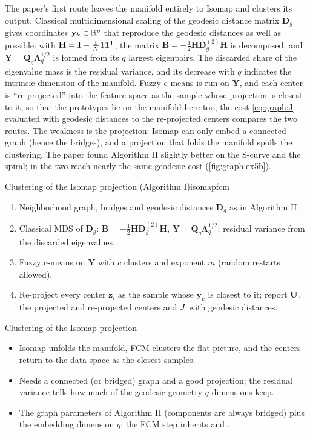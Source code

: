 The paper's first route leaves the manifold entirely to Isomap and clusters its output. Classical multidimensional scaling \cite{torgerson:1952:mds} of the geodesic distance matrix $\mathbf{D}_g$ gives coordinates $\mathbf{y}_k\in\mathbb{R}^q$ that reproduce the geodesic distances as well as possible: with $\mathbf{H}=\mathbf{I}-\tfrac1N\mathbf{1}\mathbf{1}^{\mathsf{T}}$, the matrix $\mathbf{B}=-\tfrac12\mathbf{H}\mathbf{D}_g^{(2)}\mathbf{H}$ is decomposed, and $\mathbf{Y}=\mathbf{Q}_q\boldsymbol\Lambda_q^{1/2}$ is formed from its $q$ largest eigenpairs. The discarded share of the eigenvalue mass is the residual variance, and its decrease with $q$ indicates the intrinsic dimension of the manifold. Fuzzy c-means is run on $\mathbf{Y}$, and each center is ``re-projected'' into the feature space as the sample whose projection is closest to it, so that the prototypes lie on the manifold here too; the cost \eqref{eq:graph:J} evaluated with geodesic distances to the re-projected centers compares the two routes. The weakness is the projection: Isomap can only embed a connected graph (hence the bridges), and a projection that folds the manifold spoils the clustering. The paper found Algorithm II slightly better on the S-curve and the spiral; in  the two reach nearly the same geodesic cost (\cref{fig:graph:ex5b}).

\begin{algobox}{Clustering of the Isomap projection (Algorithm I)}{isomapfcm}
\begin{enumerate}[leftmargin=*]
  \item Neighborhood graph, bridges and geodesic distances $\mathbf{D}_g$ as in Algorithm II.
  \item Classical MDS of $\mathbf{D}_g$: $\mathbf{B}=-\tfrac12\mathbf{H}\mathbf{D}_g^{(2)}\mathbf{H}$, $\mathbf{Y}=\mathbf{Q}_q\boldsymbol\Lambda_q^{1/2}$; residual variance from the discarded eigenvalues.
  \item Fuzzy c-means on $\mathbf{Y}$ with $c$ clusters and exponent $m$ (random restarts allowed).
  \item Re-project every center $\mathbf{z}_i$ as the sample whose $\mathbf{y}_k$ is closest to it; report $\mathbf{U}$, the projected and re-projected centers and $J$ with geodesic distances.
\end{enumerate}
\end{algobox}
\begin{summarybox}{Clustering of the Isomap projection}
\begin{itemize}
  \item Isomap unfolds the manifold, FCM clusters the flat picture, and the centers return to the data space as the closest samples.
  \item Needs a connected (or bridged) graph and a good projection; the residual variance tells how much of the geodesic geometry $q$ dimensions keep.
  \item The graph parameters of Algorithm II (components are always bridged) plus the embedding dimension $q$; the FCM step inherits  and .
\end{itemize}
\end{summarybox}

